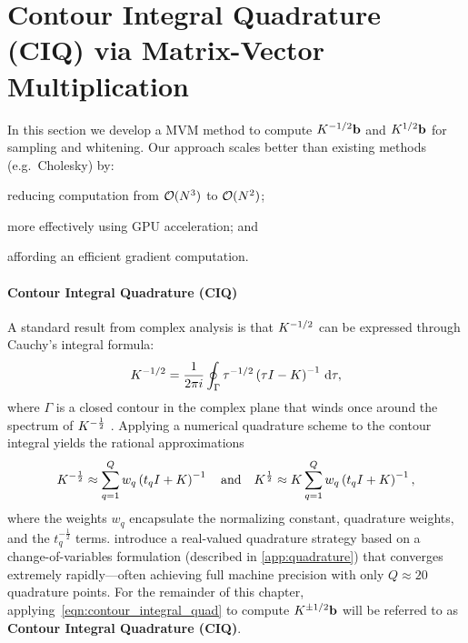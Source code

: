 \section{Contour Integral Quadrature (CIQ) via Matrix-Vector Multiplication}
\label{sec:ciq_method}

In this section we develop a MVM method to compute $K^{-1/2} \mathbf{b}$ and $K^{1/2} \mathbf{b}$ for sampling and whitening.
Our approach scales better than existing methods (e.g.~Cholesky) by:
\begin{enumerate*}
  \item reducing computation from $\bigo{N^3}$ to $\bigo{N^2}$;
  \item more effectively using GPU acceleration; and
  \item affording an efficient gradient computation.
\end{enumerate*}

\paragraph{Contour Integral Quadrature (CIQ)}
A standard result from complex analysis is that $K^{-1/2}$ can be expressed through Cauchy's integral formula:
%
$$
	K^{-1 / 2} = \frac{1}{2 \pi i} \oint_\Gamma \tau^{- 1 / 2} \left( \tau I - K \right)^{-1} \,\mathrm{d}{\tau},
$$
%
where $\Gamma$ is a closed contour in the complex plane that winds once around the spectrum of $K^{-\frac 1 2}$ \citep{davies2005computing,hale2008computing,higham2008functions}.
Applying a numerical quadrature scheme to the contour integral yields the rational approximations
%
\begin{equation}
	K^{-\frac 1 2} \approx \sum_{q=1}^Q w_q \left( t_q I + K \right)^{-1}
  \quad \text{and} \quad
	K^{\frac 1 2} \approx K \sum_{q=1}^Q w_q \left( t_q I + K \right)^{-1},
	\label{eqn:contour_integral_quad}
\end{equation}
%
where the weights $w_q$ encapsulate the normalizing constant, quadrature weights, and the $t_q^{-\frac 1 2}$ terms.
\citet{hale2008computing} introduce a real-valued quadrature strategy based on a change-of-variables formulation (described in \cref{app:quadrature})
that converges extremely rapidly---often achieving full machine precision with only $Q \approx 20$ quadrature points.
For the remainder of this chapter, applying~\cref{eqn:contour_integral_quad} to compute $K^{\pm1/2} \mathbf{b}$  will be referred to as {\bf Contour Integral Quadrature (CIQ)}.



